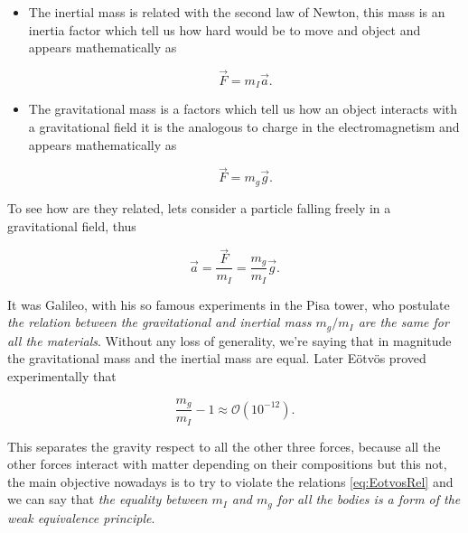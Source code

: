         \begin{itemize}
            \item The inertial mass is related with the second law of Newton, this mass is an inertia factor which tell us how hard would be to move and object and appears mathematically as

            \begin{equation}
                \Vec{F} = m_I \Vec{a}.
            \end{equation}

            \item The gravitational mass is a factors which tell us how an object interacts with a gravitational field it is the analogous to charge in the electromagnetism and appears mathematically as

            \begin{equation}
                \Vec{F} = m_g \Vec{g}.
            \end{equation}
        \end{itemize}

        To see how are they related, lets consider a particle falling freely in a gravitational field, thus

        \begin{equation}
            \Vec{a} = \frac{\Vec{F}}{m_I} = \frac{m_g}{m_I}\Vec{g}.
        \end{equation}

        It was Galileo, with his so famous experiments in the Pisa tower, who postulate \textit{the relation between the gravitational and inertial mass $m_g/m_I$ are the same for all the materials}. Without any loss of generality, we're saying that in magnitude the gravitational mass and the inertial mass are equal. Later Eötvös proved experimentally that

        \begin{equation}\label{eq:EotvosRel}
            \frac{m_g}{m_I} - 1 \approx \mathcal{O}(10^{-12}).
        \end{equation}

        This separates the gravity respect to all the other three forces, because all the other forces interact with matter depending on their compositions but this not, the main objective nowadays is to try to violate the relations \ref{eq:EotvosRel} and we can say that \textit{the equality between $m_I$ and $m_g$ for all the bodies is a form of the weak equivalence principle}.\\

